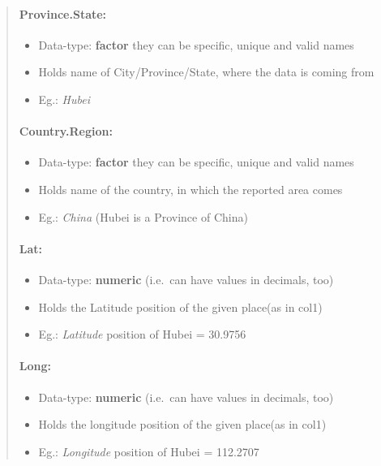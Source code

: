 \documentclass[11pt]{article}
\providecommand{\tightlist}{%
      \setlength{\itemsep}{0pt}\setlength{\parskip}{0pt}}
\begin{document}
\begin{quote}
\mbox{}%
\hypertarget{province.state}{%
\paragraph{Province.State:}\label{province.state}}

\begin{itemize}
\tightlist
\item
  Data-type: \textbf{factor} they can be specific, unique and valid
  names
\item
  Holds name of City/Province/State, where the data is coming from
\item
  Eg.: \emph{Hubei}
\end{itemize}

\mbox{}%
\hypertarget{country.region}{%
\paragraph{Country.Region:}\label{country.region}}

\begin{itemize}
\tightlist
\item
  Data-type: \textbf{factor} they can be specific, unique and valid
  names
\item
  Holds name of the country, in which the reported area comes
\item
  Eg.: \emph{China} (Hubei is a Province of China)
\end{itemize}

\mbox{}%
\hypertarget{lat}{%
\paragraph{Lat:}\label{lat}}

\begin{itemize}
\tightlist
\item
  Data-type: \textbf{numeric} (i.e.~can have values in decimals, too)
\item
  Holds the Latitude position of the given place(as in col1)
\item
  Eg.: \emph{Latitude} position of Hubei = 30.9756
\end{itemize}

\mbox{}%
\hypertarget{long}{%
\paragraph{Long:}\label{long}}

\begin{itemize}
\tightlist
\item
  Data-type: \textbf{numeric} (i.e.~can have values in decimals, too)
\item
  Holds the longitude position of the given place(as in col1)
\item
  Eg.: \emph{Longitude} position of Hubei = 112.2707
\end{itemize}


\end{quote}
\end{document}
